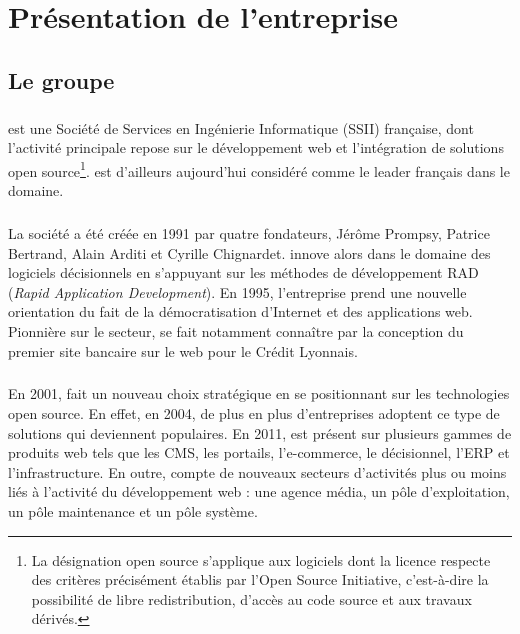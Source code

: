 \chapter{Présentation de l'entreprise}

\section{Le groupe \asmile}

\paragraph{}
\asmile{} est une Société de Services en Ingénierie Informatique (SSII) française, dont l'activité principale repose sur le développement web et l'intégration de solutions open source\footnote{La désignation open source s'applique aux logiciels dont la licence respecte des critères précisément établis par l'Open Source Initiative, c'est-à-dire la possibilité de libre redistribution, d'accès au code source et aux travaux dérivés.\cite{opensource}}.
\asmile{} est d'ailleurs aujourd'hui considéré comme le leader français dans le domaine.

\paragraph{}
La société a été créée en 1991 par quatre fondateurs, Jérôme Prompsy, Patrice Bertrand, Alain Arditi et Cyrille Chignardet.
\asmile{} innove alors dans le domaine des logiciels décisionnels en s'appuyant sur les méthodes de développement RAD (\textit{Rapid Application Development}).
En 1995, l'entreprise prend une nouvelle orientation du fait de la démocratisation d'Internet et des applications web.
Pionnière sur le secteur, \asmile{} se fait notamment connaître par la conception du premier site bancaire sur le web pour le Crédit Lyonnais.

\paragraph{}
En 2001, \asmile{} fait un nouveau choix stratégique en se positionnant sur les technologies open source.
En effet, en 2004, de plus en plus d'entreprises adoptent ce type de solutions qui deviennent populaires.
En 2011, \asmile{} est présent sur plusieurs gammes de produits web tels que les CMS, les portails, l'e-commerce, le décisionnel, l'ERP et l'infrastructure.
En outre, \asmile{} compte de nouveaux secteurs d'activités plus ou moins liés à l'activité du développement web : une agence média, un pôle d'exploitation, un pôle maintenance et un pôle système.

